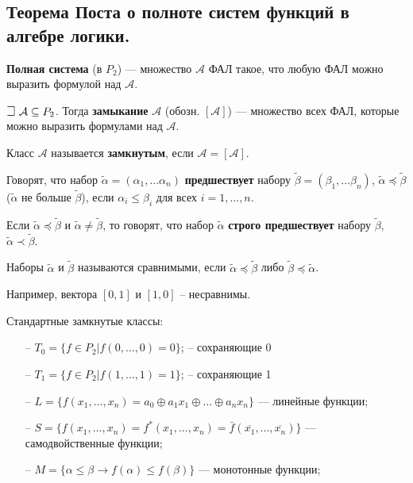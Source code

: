 \subsection{Теорема Поста о полноте систем функций в алгебре логики.}


\textbf{Полная система} (в $P_2$) --- множество $\mathcal{A}$ ФАЛ такое, что любую ФАЛ можно выразить формулой над $\mathcal{A}$.

$\mathLet ~ \mathcal{A} \subseteq P_2$. Тогда \textbf{замыкание} $\mathcal{A}$ (обозн. $[\mathcal{A}]$) --- множество всех ФАЛ, которые можно выразить формулами над $\mathcal{A}$.

Класс $\mathcal{A}$ называется \textbf{замкнутым}, если $\mathcal{A} = [\mathcal{A}]$.

Говорят, что набор $\tilde{\alpha} = (\alpha_1, ... \alpha_n)$ \textbf{предшествует} набору $\tilde{\beta} = (\beta_1, ... \beta_n)$,  $\tilde{\alpha} \preccurlyeq \tilde{\beta}$ ($\tilde{\alpha}$ не больше $\tilde{\beta}$), если $\alpha_i \leqslant \beta_i$ для всех $i = 1, ..., n$.

Если $\tilde{\alpha} \preccurlyeq \tilde{\beta}$ и $\tilde{\alpha} \neq \tilde{\beta}$, то говорят, что набор $\tilde{\alpha}$ \textbf{строго предшествует} набору $\tilde{\beta}$, $\tilde{\alpha} \prec \tilde{\beta}$.

Наборы $\tilde{\alpha}$ и $\tilde{\beta}$ называются сравнимыми, если $\tilde{\alpha} \preccurlyeq \tilde{\beta}$ либо $\tilde{\beta} \preccurlyeq \tilde{\alpha}$.

Например, вектора $[0, 1]$ и $[1, 0]$ -- несравнимы.

Стандартные замкнутые классы:
\begin{itemize}
    \item[--] $T_0 = \{f \in P_2 | f(0, \dots, 0) = 0\}$; -- сохраняющие 0
    \item[--] $T_1 = \{f \in P_2 | f(1, \dots, 1) = 1\}$; -- сохраняющие 1
    \item[--] $L = \{f(x_1, \dots, x_n) = a_0 \oplus a_1 x_1 \oplus \dots \oplus a_n x_n\}$ --- линейные функции;
    \item[--] $S = \{f(x_1, \dots, x_n) = f^*(x_1, \dots, x_n) = \bar{f}(\overline{x_1}, \dots, \overline{x_n})\}$ --- самодвойственные функции;
    \item[--] $M = \{\alpha \leqslant \beta \rightarrow f(\alpha) \leqslant f(\beta)\}$ --- монотонные функции;
\end{itemize}

